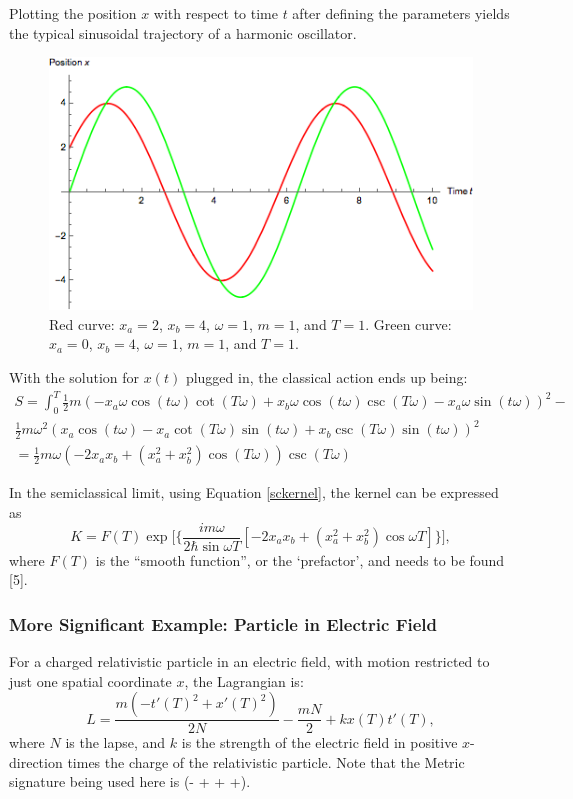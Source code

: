 \documentclass[12pt]{revtex4}
\begin{document}
Plotting the position $x$ with respect to time $t$ after defining the parameters yields the typical sinusoidal trajectory of a harmonic oscillator.

\begin{figure}[h]
	\centering
	\includegraphics[width=0.7\linewidth]{"oscillator trajectory"}
	\caption{Red curve: $x_a=2$, $x_b=4$, $\omega=1$, $m=1$, and $T=1$. Green curve: $x_a=0$, $x_b=4$, $\omega=1$, $m=1$, and $T=1$.}
	\label{fig:oscillator}
\end{figure}

With the solution for $x(t)$ plugged in, the classical action ends up being:
\begin{multline*}
S = \int_{0}^{T} \frac{1}{2} m (-x_a \omega \cos(t \omega) \cot(T \omega) + 
x_b \omega \cos(t \omega) \csc(T \omega) - 
x_a \omega \sin(t \omega))^2 - \\
\frac{1}{2} m \omega^2 (x_a \cos(t \omega) - 
x_a \cot(T \omega) \sin(t \omega) + 
x_b \csc(T \omega) \sin(t \omega))^2 \\
= \frac{1}{2} m \omega (-2 x_a x_b + (x_a^2 + x_b^2) \cos(T \omega)) \csc(T \omega)
\end{multline*} 

In the semiclassical limit, using Equation \ref{sckernel}, the kernel can be expressed as 
\[ K=F(T) \exp \Bigg[{\Bigg\{\frac{im\omega}{2 \hbar \sin\omega T} [-2 x_a x_b + (x_a^2 + x_b^2) \cos \omega T]\Bigg\}}\Bigg],\]
where $F(T)$ is the ``smooth function'', or the `prefactor', and needs to be found [5]. 

\subsubsection{More Significant Example: Particle in Electric Field}
For a charged relativistic particle in an electric field, with motion restricted to just one spatial coordinate $x$, the Lagrangian is:
\[ L = \frac{m (-t'(T)^2 + x'(T)^2)}{2N} -\frac{m N}{2} + k x(T) t'(T),\]
where $N$ is the lapse, and $k$ is the strength of the electric field in positive $x$-direction times the charge of the relativistic particle. Note that the Metric signature being used here is (- + + +).
\end{document}
